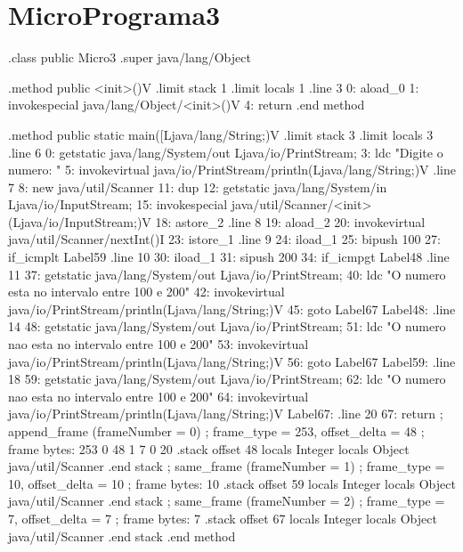 \documentclass[12pt,a4paper,twoside]{report}
\begin{document}
\section{MicroPrograma3}
\begin{terminal}
.class public Micro3
.super java/lang/Object

.method public <init>()V
  .limit stack 1
  .limit locals 1
  .line 3
  0: aload_0
  1: invokespecial java/lang/Object/<init>()V
  4: return
.end method

.method public static main([Ljava/lang/String;)V
  .limit stack 3
  .limit locals 3
  .line 6
  0: getstatic java/lang/System/out Ljava/io/PrintStream;
  3: ldc "Digite o numero: "
  5: invokevirtual java/io/PrintStream/println(Ljava/lang/String;)V
  .line 7
  8: new java/util/Scanner
  11: dup
  12: getstatic java/lang/System/in Ljava/io/InputStream;
  15: invokespecial java/util/Scanner/<init>(Ljava/io/InputStream;)V
  18: astore_2
  .line 8
  19: aload_2
  20: invokevirtual java/util/Scanner/nextInt()I
  23: istore_1
  .line 9
  24: iload_1
  25: bipush 100
  27: if_icmplt Label59
  .line 10
  30: iload_1
  31: sipush 200
  34: if_icmpgt Label48
  .line 11
  37: getstatic java/lang/System/out Ljava/io/PrintStream;
  40: ldc "O numero esta no intervalo entre 100 e 200"
  42: invokevirtual java/io/PrintStream/println(Ljava/lang/String;)V
  45: goto Label67
Label48:
  .line 14
  48: getstatic java/lang/System/out Ljava/io/PrintStream;
  51: ldc "O numero nao esta no intervalo entre 100 e 200"
  53: invokevirtual java/io/PrintStream/println(Ljava/lang/String;)V
  56: goto Label67
Label59:
  .line 18
  59: getstatic java/lang/System/out Ljava/io/PrintStream;
  62: ldc "O numero nao esta no intervalo entre 100 e 200"
  64: invokevirtual java/io/PrintStream/println(Ljava/lang/String;)V
Label67:
  .line 20
  67: return
  ; append_frame (frameNumber = 0)
  ; frame_type = 253, offset_delta = 48
  ; frame bytes: 253 0 48 1 7 0 20
  .stack
    offset 48
    locals Integer
    locals Object java/util/Scanner
    .end stack
  ; same_frame (frameNumber = 1)
  ; frame_type = 10, offset_delta = 10
  ; frame bytes: 10
  .stack
    offset 59
    locals Integer
    locals Object java/util/Scanner
    .end stack
  ; same_frame (frameNumber = 2)
  ; frame_type = 7, offset_delta = 7
  ; frame bytes: 7
  .stack
    offset 67
    locals Integer
    locals Object java/util/Scanner
    .end stack
.end method

\end{terminal}
\end{document}
